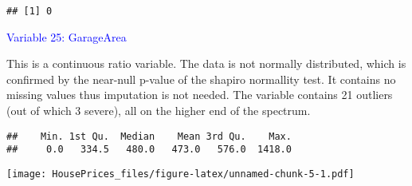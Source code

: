 \documentclass[
]{article}
\newenvironment{Shaded}{\begin{snugshade}}{\end{snugshade}}
\newcommand{\AttributeTok}[1]{\textcolor[rgb]{0.13,0.29,0.53}{#1}}
\newcommand{\CommentTok}[1]{\textcolor[rgb]{0.56,0.35,0.01}{\textit{#1}}}
\newcommand{\ConstantTok}[1]{\textcolor[rgb]{0.56,0.35,0.01}{#1}}
\newcommand{\FunctionTok}[1]{\textcolor[rgb]{0.13,0.29,0.53}{\textbf{#1}}}
\newcommand{\NormalTok}[1]{#1}
\newcommand{\SpecialCharTok}[1]{\textcolor[rgb]{0.81,0.36,0.00}{\textbf{#1}}}
\newcommand{\StringTok}[1]{\textcolor[rgb]{0.31,0.60,0.02}{#1}}
\begin{document}
\begin{verbatim}
## [1] 0
\end{verbatim}

\textcolor{blue}{Variable 25: GarageArea}

This is a continuous ratio variable. The data is not normally
distributed, which is confirmed by the near-null p-value of the shapiro
normallity test. It contains no missing values thus imputation is not
needed. The variable contains 21 outliers (out of which 3 severe), all
on the higher end of the spectrum.

\begin{Shaded}
\end{Shaded}

\begin{verbatim}
##    Min. 1st Qu.  Median    Mean 3rd Qu.    Max. 
##     0.0   334.5   480.0   473.0   576.0  1418.0
\end{verbatim}

\begin{Shaded}
\end{Shaded}

\texttt{[image: HousePrices\_files/figure-latex/unnamed-chunk-5-1.pdf]}

\begin{Shaded}
\end{Shaded}
\end{document}
